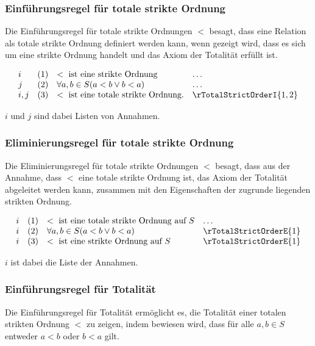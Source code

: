\documentclass[main.tex]{subfiles}
\begin{document}
\subsubsection*{Einführungsregel für totale strikte Ordnung}
\label{rule:rTotalStrictOrderI}
Die Einführungsregel für totale strikte Ordnungen \(<\) besagt, dass eine Relation als totale strikte Ordnung definiert werden kann, wenn gezeigt wird, dass es sich um eine strikte Ordnung handelt und das Axiom der Totalität erfüllt ist.

\[
\begin{array}{llll}
    i       & (1) & < \text{ ist eine strikte Ordnung} & \dots \\
    j       & (2) & \forall a, b \in S (a < b \lor b < a) & \dots \\
    i,j     & (3) & < \text{ ist eine totale strikte Ordnung.} & \rTotalStrictOrderI{1,2}
\end{array}
\]

\(i\) und \(j\) sind dabei Listen von Annahmen.

\subsubsection*{Eliminierungsregel für totale strikte Ordnung}
\label{rule:rTotalStrictOrderE}
Die Eliminierungsregel für totale strikte Ordnungen \(<\) besagt, dass aus der Annahme, dass \(<\) eine totale strikte Ordnung ist, das Axiom der Totalität abgeleitet werden kann, zusammen mit den Eigenschaften der zugrunde liegenden strikten Ordnung.

\[
\begin{array}{llll}
    i       & (1) & < \text{ ist eine totale strikte Ordnung auf } S & \dots \\
    i       & (2) & \forall a, b \in S (a < b \lor b < a) & \rTotalStrictOrderE{1} \\
    i       & (3) & < \text{ ist eine strikte Ordnung auf }S & \rTotalStrictOrderE{1}
\end{array}
\]

\(i\) ist dabei die Liste der Annahmen.

\subsubsection*{Einführungsregel für Totalität}
\label{rule:rTotalityStrictRI}
Die Einführungsregel für Totalität ermöglicht es, die Totalität einer totalen strikten Ordnung \(<\) zu zeigen, indem bewiesen wird, dass für alle \(a, b \in S\) entweder \(a < b\) oder \(b < a\) gilt.
\end{document}

